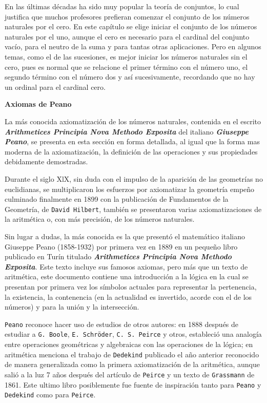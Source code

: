 En las últimas décadas ha sido muy popular la teoría de conjuntos,
lo cual justifica que muchos profesores prefieran comenzar el conjunto
de los números naturales por el cero. En este capítulo se elige iniciar
el conjunto de los números naturales por el uno, aunque el cero es
necesario para el cardinal del conjunto vacío, para el neutro de la
suma y para tantas otras aplicaciones. Pero en algunos temas, como
el de las sucesiones, es mejor iniciar los números naturales sin el
cero, pues es normal que se relacione el primer término con el número
uno, el segundo término con el número dos y así sucesivamente, recordando
que no hay un ordinal para el cardinal cero. 

\textbf{Axiomas de Peano}

La más conocida axiomatización de los números naturales, contenida
en el escrito \textbf{\textsl{Arithmetices Principia Nova Methodo
Exposita}} del italiano \textbf{\textsl{Giuseppe Peano}}, se presenta
en esta sección en forma detallada, al igual que la forma mas moderna
de la axiomatización, la definición de las operaciones y sus propiedades
debidamente demostradas. 

Durante el siglo XlX, sin duda con el impulso de la aparición de las
geometrías no euclidianas, se multiplicaron los esfuerzos por axiomatizar
la geometría empeño culminado finalmente en 1899 con la publicación
de Fundamentos de la Geometría, de \texttt{David Hilbert}, también
se presentaron varias axiomatizaciones de la aritmética o, con más
precisión, de los números naturales. 

Sin lugar a dudas, la más conocida es la que presentó el matemático
italiano Giuseppe Peano (1858-1932) por primera vez en 1889 en un
pequeño libro publicado en Turín titulado \textbf{\textsl{Arithmetices
Principia Nova Methodo Exposita}}. Este texto incluye sus famosos
axiomas, pero más que un texto de aritmética, este documento contiene
una introducción a la lógica en la cual se presentan por primera vez
los símbolos actuales para representar la pertenencia, la existencia,
la contenencia (en la actualidad es invertido, acorde con el de los
números) y para la unión y la intersección. 

\texttt{Peano} reconoce hacer uso de estudios de otros autores: en
1888 después de estudiar a \texttt{G. Boole}, \texttt{E. Schröder},
\texttt{C. S. Peirce} y otros, estableció una analogía entre operaciones
geométricas y algebraicas con las operaciones de la lógica; en aritmética
menciona el trabajo de \texttt{Dedekind} publicado el año anterior
reconocido de manera generalizada como la primera axiomatización de
la aritmética, aunque salió a la luz 7 años después del artículo de
\texttt{Peirce} y un texto de \texttt{Grassmann} de 1861. Este ultimo
libro posiblemente fue fuente de inspiración tanto para \texttt{Peano}
y \texttt{Dedekind} como para \texttt{Peirce}. 

